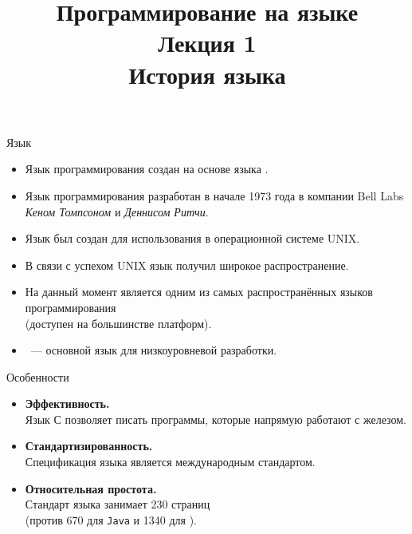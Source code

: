 \documentclass[aspectration=1610]{beamer}
\title{{\bf Программирование на языке \langcpp\protect\\Лекция 1\protect\vspace{1em}\\}История языка \langcpp}
\begin{document}
\begin{frame} 
  \titlepage
\end{frame}


\begin{frame}[fragile]{Язык \langc}
    \begin{itemize}
        \item Язык программирования \langcpp создан на основе языка \langc.

        \item 
            Язык программирования \langc разработан в начале 1973 года в 
            компании Bell Labs {\em Кеном Томпсоном} и {\em Деннисом Ритчи}.

        \item            
            Язык \langc был создан для использования в операционной системе UNIX.

        \item
            В связи с успехом UNIX язык \langc получил широкое
            распространение. 
            
        \item 
            На данный момент \langc является одним из самых распространённых языков
            программирования\\ (доступен на большинстве платформ).
                
        \item \langc~--- основной язык для низкоуровневой разработки.
    \end{itemize}
\end{frame}

\begin{frame}{Особенности \langc}
    \begin{itemize}
        \item {\bf Эффективность.}\\
            Язык С позволяет писать программы, которые напрямую работают с железом. 

        \item {\bf Стандартизированность.}\\
            Спецификация языка \langc является международным стандартом.
        
        \item {\bf Относительная простота.}\\
            Стандарт языка \langc занимает 230 страниц\\
            (против 670 для \texttt{Java} и 1340 для \langcpp).
    \end{itemize}
\end{frame}
\end{document}
